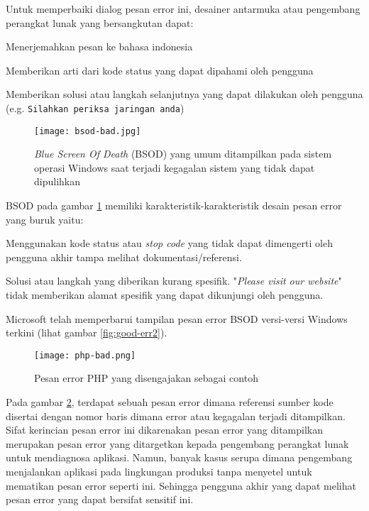 Untuk memperbaiki dialog pesan error ini, desainer antarmuka atau
pengembang perangkat lunak yang bersangkutan dapat:
\begin{pros}
\item Menerjemahkan pesan ke bahasa indonesia
\item Memberikan arti dari kode status yang dapat dipahami oleh pengguna
\item Memberikan solusi atau langkah selanjutnya yang dapat dilakukan
  oleh pengguna (e.g. \texttt{Silahkan periksa jaringan anda})
\end{pros}

\begin{figure}[H]
  \centering
  \texttt{[image: bsod-bad.jpg]}
  \caption{\textit{Blue Screen Of Death} (BSOD) yang umum ditampilkan pada
    sistem operasi Windows saat terjadi kegagalan sistem yang tidak
  dapat dipulihkan}
  \label{fig:bad-err2}
\end{figure}
BSOD pada gambar \ref{fig:bad-err2} memiliki
karakteristik-karakteristik desain pesan error yang buruk yaitu:
\begin{cons}
\item Menggunakan kode status atau \textit{stop code} yang tidak
  dapat dimengerti oleh pengguna akhir tampa melihat dokumentasi/referensi.
\item Solusi atau langkah yang diberikan kurang spesifik.
  "\textit{Please visit our website}" tidak memberikan alamat
  spesifik yang dapat dikunjungi oleh pengguna.
\end{cons}
Microsoft telah memperbarui tampilan pesan error BSOD versi-versi
Windows terkini (lihat gambar \ref{fig:good-err2}).

\begin{figure}[H]
  \centering
  \texttt{[image: php-bad.png]}
  \caption{Pesan error PHP yang disengajakan sebagai contoh}
  \label{fig:bad-err3}
\end{figure}
Pada gambar \ref{fig:bad-err3}, terdapat sebuah pesan error dimana
referensi sumber kode disertai dengan nomor baris dimana error atau
kegagalan terjadi ditampilkan. Sifat kerincian pesan error ini
dikarenakan pesan error yang ditampilkan merupakan pesan error yang
ditargetkan kepada pengembang perangkat lunak untuk mendiagnosa
aplikasi. Namun, banyak kasus serupa dimana pengembang menjalankan
aplikasi pada lingkungan produksi tanpa menyetel untuk mematikan
pesan error seperti ini. Sehingga pengguna akhir yang dapat melihat
pesan error yang dapat bersifat sensitif ini.

